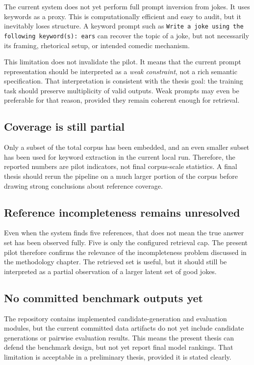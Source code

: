\documentclass[14pt,a4paper]{extreport}
\newcommand{\prompt}[1]{\texttt{#1}}
\begin{document}
The current system does not yet perform full prompt inversion from jokes. It uses keywords as a proxy. This is computationally efficient and easy to audit, but it inevitably loses structure. A keyword prompt such as \prompt{Write a joke using the following keyword(s): ears} can recover the topic of a joke, but not necessarily its framing, rhetorical setup, or intended comedic mechanism.

This limitation does not invalidate the pilot. It means that the current prompt representation should be interpreted as a \emph{weak constraint}, not a rich semantic specification. That interpretation is consistent with the thesis goal: the training task should preserve multiplicity of valid outputs. Weak prompts may even be preferable for that reason, provided they remain coherent enough for retrieval.

\subsection{Coverage is still partial}

Only a subset of the total corpus has been embedded, and an even smaller subset has been used for keyword extraction in the current local run. Therefore, the reported numbers are pilot indicators, not final corpus-scale statistics. A final thesis should rerun the pipeline on a much larger portion of the corpus before drawing strong conclusions about reference coverage.

\subsection{Reference incompleteness remains unresolved}

Even when the system finds five references, that does not mean the true answer set has been observed fully. Five is only the configured retrieval cap. The present pilot therefore confirms the relevance of the incompleteness problem discussed in the methodology chapter. The retrieved set is useful, but it should still be interpreted as a partial observation of a larger latent set of good jokes.

\subsection{No committed benchmark outputs yet}

The repository contains implemented candidate-generation and evaluation modules, but the current committed data artifacts do not yet include candidate generations or pairwise evaluation results. This means the present thesis can defend the benchmark design, but not yet report final model rankings. That limitation is acceptable in a preliminary thesis, provided it is stated clearly.
\end{document}
